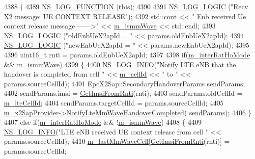 \begin{DoxyCode}
4388 \{
4389   \hyperlink{log-macros-disabled_8h_a90b90d5bad1f39cb1b64923ea94c0761}{NS\_LOG\_FUNCTION} (\textcolor{keyword}{this});
4390 
4391   \hyperlink{group__logging_ga88acd260151caf2db9c0fc84997f45ce}{NS\_LOG\_LOGIC} (\textcolor{stringliteral}{"Recv X2 message: UE CONTEXT RELEASE"});
4392   std::cout << \textcolor{stringliteral}{" Enb received Ue context release message ------>"} << \hyperlink{classns3_1_1LteEnbRrc_a44515fc06d16f2b477afe0c05425e206}{m\_ismmWave} << std::endl;
4393   \hyperlink{group__logging_ga88acd260151caf2db9c0fc84997f45ce}{NS\_LOG\_LOGIC} (\textcolor{stringliteral}{"oldEnbUeX2apId = "} << params.oldEnbUeX2apId);
4394   \hyperlink{group__logging_ga88acd260151caf2db9c0fc84997f45ce}{NS\_LOG\_LOGIC} (\textcolor{stringliteral}{"newEnbUeX2apId = "} << params.newEnbUeX2apId);
4395 
4396   uint16\_t rnti = params.oldEnbUeX2apId;
4397 
4398   \textcolor{keywordflow}{if}(\hyperlink{classns3_1_1LteEnbRrc_a25849018e31a7766dfc839663e4c5ca4}{m\_interRatHoMode} && \hyperlink{classns3_1_1LteEnbRrc_a44515fc06d16f2b477afe0c05425e206}{m\_ismmWave})
4399   \{
4400     \hyperlink{group__logging_gafbd73ee2cf9f26b319f49086d8e860fb}{NS\_LOG\_INFO}(\textcolor{stringliteral}{"Notify LTE eNB that the handover is completed from cell "} << 
      \hyperlink{classns3_1_1LteEnbRrc_a4ced331e168e6c1aeca0bb11be19b8c7}{m\_cellId} << \textcolor{stringliteral}{" to "} << params.sourceCellId);
4401     EpcX2Sap::SecondaryHandoverParams sendParams;
4402     sendParams.imsi = \hyperlink{classns3_1_1LteEnbRrc_a1a1a3c1703bd1d39d4fcd0657788d1bd}{GetImsiFromRnti}(rnti);
4403     sendParams.oldCellId = \hyperlink{classns3_1_1LteEnbRrc_a23c61a4208f98c30a566e685ac932781}{m\_lteCellId};
4404     sendParams.targetCellId = params.sourceCellId;
4405     \hyperlink{classns3_1_1LteEnbRrc_ae8dc75f4f6f63b7736d86204a4beb415}{m\_x2SapProvider}->\hyperlink{classns3_1_1EpcX2SapProvider_a507ba3a13c3c0098935679ff1b0f2e4d}{NotifyLteMmWaveHandoverCompleted}(
      sendParams);
4406   \}
4407   \textcolor{keywordflow}{else} \textcolor{keywordflow}{if}(\hyperlink{classns3_1_1LteEnbRrc_a25849018e31a7766dfc839663e4c5ca4}{m\_interRatHoMode} && !\hyperlink{classns3_1_1LteEnbRrc_a44515fc06d16f2b477afe0c05425e206}{m\_ismmWave})
4408   \{
4409     \hyperlink{group__logging_gafbd73ee2cf9f26b319f49086d8e860fb}{NS\_LOG\_INFO}(\textcolor{stringliteral}{"LTE eNB received UE context release from cell "} << params.sourceCellId);
4410     \hyperlink{classns3_1_1LteEnbRrc_a0d7b04f0383b0dc3f6a7360b87cbaeee}{m\_lastMmWaveCell}[\hyperlink{classns3_1_1LteEnbRrc_a1a1a3c1703bd1d39d4fcd0657788d1bd}{GetImsiFromRnti}(rnti)] = params.sourceCellId;

\end{DoxyCode}

